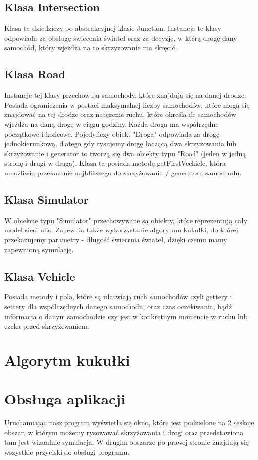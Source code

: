 \documentclass{article}
\begin{document}
\subsection{Klasa Intersection}
    Klasa ta dziedziczy po abstrakcyjnej klasie Junction. Instancja te klasy odpowiada za obsługę świecenia świateł oraz za decyzję, w którą drogę dany samochód, który wjeżdża na to skrzyżowanie ma skręcić. 

\subsection{Klasa Road}
    Instancje tej klasy przechowują samochody, które znajdują się na danej drodze. Posiada ograniczenia w postaci maksymalnej liczby samochodów, które mogą się znajdować na tej drodze oraz natęzenie ruchu, które określa ile samochodów wjeżdża na daną drogę w ciągu godziny. Każda droga ma współrzędne początkowe i końcowe. Pojedyńczy obiekt "Droga" odpowiada za drogę jednokierunkową, dlatego gdy rysujemy drogę łaczącą dwa skrzyżowania lub skrzyżowanie i generator to tworzą się dwa obiekty typu "Road" (jeden w jedną stronę i drugi w drugą). Klasa ta posiada metodę getFirstVechicle, która umożliwia przekazanie najbliższego do skrzyżowania / generatora samochodu.

\subsection{Klasa Simulator}
    W obiekcie typu "Simulator" przechowywane są obiekty, które reprezentują cały model sieci ulic. Zapewnia także wykorzystanie algorytmu kukułki, do której przekazujemy parametry - długość świecenia świateł, dzięki czemu mamy zapewnioną symulację.

\subsection{Klasa Vehicle}
    Posiada metody i pola, które są ułatwiają ruch samochodów czyli gettery i settery dla współrzędnych danego samochodu, oraz czas oczekiwania, bądź informacja o danym samochodzie czy jest w konkretnym momencie w ruchu lub czeka przed skrzyżowaniem.

\section{Algorytm kukułki}

\section{Obsługa aplikacji}
    Uruchamiając nasz program wyświetla się okno, które jest podzielone na 2 seskcje obszar, w którym możemy rysowawać skrzyżowania i drogi oraz przedstawiona tam jest wizualnie symulacja. W drugim obszarze po prawej stronie znajdują się wszystkie przyciski do obsługi programu.
\end{document}
